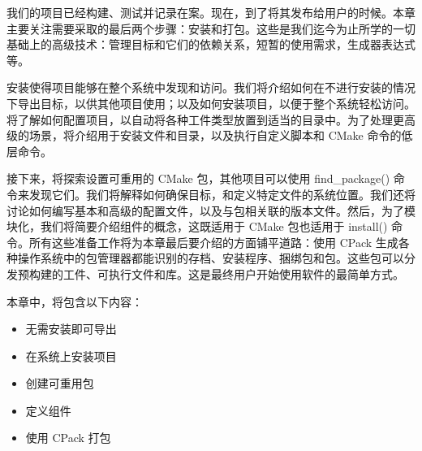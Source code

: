 我们的项目已经构建、测试并记录在案。现在，到了将其发布给用户的时候。本章主要关注需要采取的最后两个步骤：安装和打包。这些是我们迄今为止所学的一切基础上的高级技术：管理目标和它们的依赖关系，短暂的使用需求，生成器表达式等。

安装使得项目能够在整个系统中发现和访问。我们将介绍如何在不进行安装的情况下导出目标，以供其他项目使用；以及如何安装项目，以便于整个系统轻松访问。将了解如何配置项目，以自动将各种工件类型放置到适当的目录中。为了处理更高级的场景，将介绍用于安装文件和目录，以及执行自定义脚本和 CMake 命令的低层命令。

接下来，将探索设置可重用的 CMake 包，其他项目可以使用 find\_package() 命令来发现它们。我们将解释如何确保目标，和定义特定文件的系统位置。我们还将讨论如何编写基本和高级的配置文件，以及与包相关联的版本文件。然后，为了模块化，我们将简要介绍组件的概念，这既适用于 CMake 包也适用于 install() 命令。所有这些准备工作将为本章最后要介绍的方面铺平道路：使用 CPack 生成各种操作系统中的包管理器都能识别的存档、安装程序、捆绑包和包。这些包可以分发预构建的工件、可执行文件和库。这是最终用户开始使用软件的最简单方式。

本章中，将包含以下内容：

\begin{itemize}
\item
无需安装即可导出

\item
在系统上安装项目

\item
创建可重用包

\item
定义组件

\item
使用 CPack 打包
\end{itemize}








